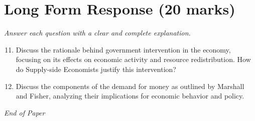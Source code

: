 \documentclass[12pt]{article}
\begin{document}
\section*{Long Form Response (20 marks)}
\textit{Answer each question with a clear and complete explanation.}
\begin{enumerate}[label=\arabic*.]
\setcounter{enumi}{10}
\item Discuss the rationale behind government intervention in the economy, focusing on its effects on economic activity and resource redistribution. How do Supply-side Economists justify this intervention?
\item Discuss the components of the demand for money as outlined by Marshall and Fisher, analyzing their implications for economic behavior and policy.
\end{enumerate}

\vfill
\noindent\textit{End of Paper}
\end{document}
